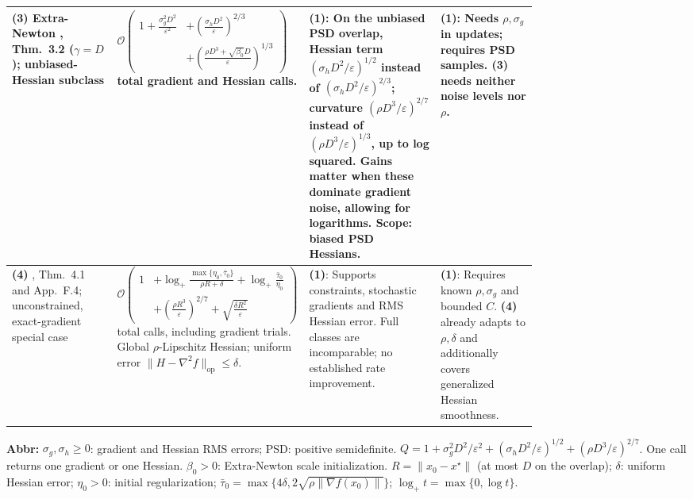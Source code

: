\begin{table}[tp]
\begin{threeparttable}
\begin{tabularx}{\linewidth}{@{}>{\raggedright\arraybackslash}p{0.20\linewidth}>{\raggedright\arraybackslash}p{0.32\linewidth}>{\raggedright\arraybackslash}p{0.25\linewidth}>{\raggedright\arraybackslash}X@{}}
\midrule
\textbf{(3)} Extra-Newton \citep{hascExtraNewton2022}, Thm.~3.2 ($\gamma=D$); unbiased-Hessian subclass
& $\mathcal{O}\!\left(\begin{aligned}1+\frac{\sigma_g^2D^2}{\varepsilon^2}&+\left(\frac{\sigma_hD^2}{\varepsilon}\right)^{2/3}\\[-2pt]&+\left(\frac{\rho D^3+\sqrt{\beta_0}D}{\varepsilon}\right)^{1/3}\end{aligned}\right)$ total gradient and Hessian calls.
& \textbf{(1)}: On the unbiased PSD overlap, Hessian term $(\sigma_hD^2/\varepsilon)^{1/2}$ instead of $(\sigma_hD^2/\varepsilon)^{2/3}$; curvature $(\rho D^3/\varepsilon)^{2/7}$ instead of $(\rho D^3/\varepsilon)^{1/3}$, up to log squared. Gains matter when these dominate gradient noise, allowing for logarithms. Scope: biased PSD Hessians.
& \textbf{(1)}: Needs $\rho,\sigma_g$ in updates; requires PSD samples. \textbf{(3)} needs neither noise levels nor $\rho$. \\
\midrule
\textbf{(4)} \citep{hascAgafonov2026Inexact}, Thm.~4.1 and App.~F.4; unconstrained, exact-gradient special case
& $\mathcal{O}\!\left(\begin{aligned}1&+\log_+\frac{\max\{\eta_0,\bar\tau_0\}}{\rho R+\delta}+\log_+\frac{\bar\tau_0}{\eta_0}\\[-2pt]&+\left(\frac{\rho R^3}{\varepsilon}\right)^{2/7}+\sqrt{\frac{\delta R^2}{\varepsilon}}\end{aligned}\right)$ total calls, including gradient trials. Global $\rho$-Lipschitz Hessian; uniform error $\|H-\nabla^2f\|_{\mathrm{op}}\le\delta$.
& \textbf{(1)}: Supports constraints, stochastic gradients and RMS Hessian error. Full classes are incomparable; no established rate improvement.
& \textbf{(1)}: Requires known $\rho,\sigma_g$ and bounded $C$. \textbf{(4)} already adapts to $\rho,\delta$ and additionally covers generalized Hessian smoothness. \\
\bottomrule
\end{tabularx}
\begin{tablenotes}[flushleft]\footnotesize
\item[] \textbf{Abbr:} $\sigma_g,\sigma_h\ge0$: gradient and Hessian RMS errors; PSD: positive semidefinite. $Q=1+\sigma_g^2D^2/\varepsilon^2+(\sigma_hD^2/\varepsilon)^{1/2}+(\rho D^3/\varepsilon)^{2/7}$. One call returns one gradient or one Hessian. $\beta_0>0$: Extra-Newton scale initialization. $R=\|x_0-x^\star\|$ (at most $D$ on the overlap); $\delta$: uniform Hessian error; $\eta_0>0$: initial regularization; $\bar\tau_0=\max\{4\delta,2\sqrt{\rho\|\nabla f(x_0)\|}\}$; $\log_+ t=\max\{0,\log t\}$.
\end{tablenotes}
\end{threeparttable}
\end{table}
